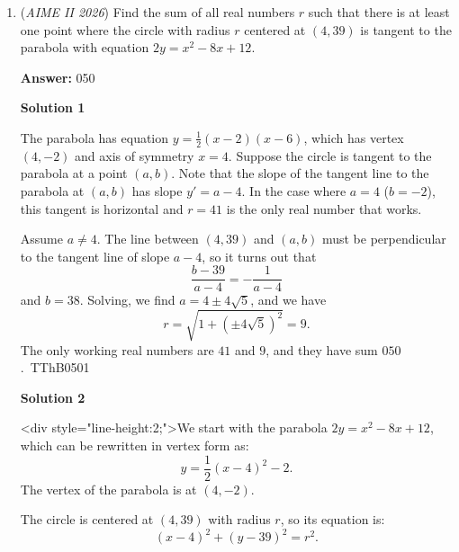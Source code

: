 \begin{enumerate}
 We simplify this equation to get $3r-5b=2$. We want to find the $5$ smallest solutions for $r+b$ that satisfy this condition. We can see that the absolute smallest values of $r+b$ will not work, as the sum must be greater than $16$. We realize that the solution will be constrained by an integer $z$. By inspection, we see the smallest solution will be $(4,2)$, and this lets us generalize the solution set.

 We say that $r$ is $4+5z$ and $b$ is $2+3z$ because the greatest common divisor of $3$ and $5$ is one. We add $r+b$ to get that $n$ equals $6+8z$. We find the least solution greater than $14$ and find our answer of $22+30+38+46+54$ or $\boxed{190}$.

 


	\item (\textit{AIME II 2026}) Find the sum of all real numbers $r$ such that there is at least one point where the circle with radius $r$ centered at $(4, 39)$ is tangent to the parabola with equation $2y = x^2 - 8x + 12.$

 \textbf{Answer: }050



\textbf{Solution 1}

The parabola has equation $y=\frac{1}{2}(x-2)(x-6)$, which has vertex $(4,-2)$ and axis of symmetry $x=4$. Suppose the circle is tangent to the parabola at a point $(a,b)$. Note that the slope of the tangent line to the parabola at $(a,b)$ has slope $y'=a-4$. In the case where $a=4$ ($b=-2$), this tangent is horizontal and $r=41$ is the only real number that works.

 Assume $a\neq 4$. The line between $(4,39)$ and $(a,b)$ must be perpendicular to the tangent line of slope $a-4$, so it turns out that 
 \[\frac{b-39}{a-4} = -\frac{1}{a-4}\]and $b=38$. Solving, we find $a=4\pm 4\sqrt{5}$, and we have 
 \[r = \sqrt{1+(\pm4\sqrt{5})^2} = 9.\]The only working real numbers are $41$ and $9$, and they have sum $\boxed{050}$.~TThB0501

 


 



\textbf{Solution 2}

<div style="line-height:2;">We start with the parabola \(2y = x^2 - 8x + 12\), which can be rewritten in vertex form as:
 \[y = \frac{1}{2}(x - 4)^2 - 2.\]The vertex of the parabola is at \((4, -2)\).

 The circle is centered at \((4, 39)\) with radius \(r\), so its equation is:
 \[(x - 4)^2 + (y - 39)^2 = r^2.\]


\end{enumerate}
